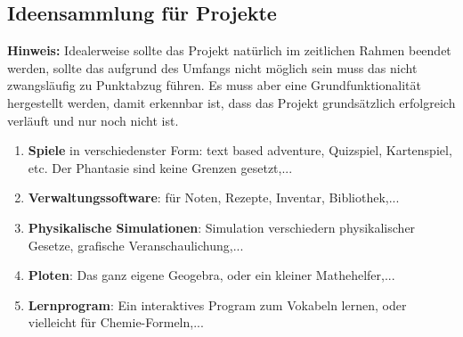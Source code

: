 \documentclass{article}
\begin{document}
\subsection{Ideensammlung für Projekte}
\label{sec:ideen}

\textbf{Hinweis:} Idealerweise sollte das Projekt natürlich im zeitlichen Rahmen beendet werden, sollte das aufgrund des Umfangs nicht möglich sein muss das nicht zwangsläufig zu Punktabzug führen. Es muss aber eine Grundfunktionalität hergestellt werden, damit erkennbar ist, dass das Projekt grundsätzlich erfolgreich verläuft und nur noch nicht  ist. 

\begin{enumerate}
    \item \textbf{Spiele} in verschiedenster Form: text based adventure, Quizspiel, Kartenspiel, etc. Der Phantasie sind keine Grenzen gesetzt,...
    \item \textbf{Verwaltungssoftware}: für Noten, Rezepte, Inventar, Bibliothek,...
    \item \textbf{Physikalische Simulationen}: Simulation verschiedern physikalischer Gesetze, grafische Veranschaulichung,...
    \item \textbf{Ploten}: Das ganz eigene Geogebra, oder ein kleiner Mathehelfer,...
    \item \textbf{Lernprogram}: Ein interaktives Program zum Vokabeln lernen, oder vielleicht für Chemie-Formeln,...
\end{enumerate}
\end{document}
